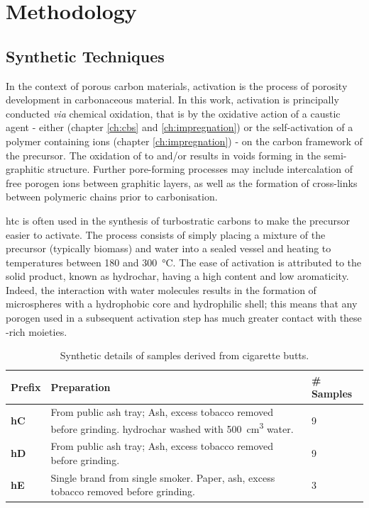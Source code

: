 \chapter{Methodology}
\label{ch:methodology}

\newpage
\section{Synthetic Techniques}

In the context of porous carbon materials, activation is the process of porosity development in carbonaceous material.\citep{Sevilla2014Energy} In this work, activation is principally conducted \textit{via} chemical oxidation,\citep{Sevilla2014Energy} that is by the oxidative action of a caustic agent - either  (chapter \ref{ch:cbs} and \ref{ch:impregnation}) or the self-activation of a polymer containing  ions (chapter \ref{ch:impregnation}) - on the carbon framework of the precursor. The oxidation of  to  and/or  results in voids forming in the semi-graphitic structure.\citep{Wang2009High, Wang2012, Otowa1993Production} Further pore-forming processes may include intercalation of free \gls{porogen} ions between graphitic layers,\citep{LozanoCastello2007Carbon} as well as the formation of cross-links between polymeric chains prior to carbonisation.\citep{lin2015preparation, yu2017koh, yu2017one}

\Gls{htc} is often used in the synthesis of \glspl{turbostratic carbon} to make the precursor easier to activate. The process consists of simply placing a mixture of the precursor (typically biomass) and water into a sealed vessel and heating to temperatures between 180 and \qty{300}{\degreeCelsius}. The ease of activation is attributed to the solid product, known as \gls{hydrochar}, having a high  content and low aromaticity.\citep{Sevilla2011Hydrothermal, Sevilla2009Chemical, Sevilla2009a} Indeed, the interaction with water molecules results in the formation of microspheres with a hydrophobic core and hydrophilic shell; this means that any \gls{porogen} used in a subsequent activation step has much greater contact with these -rich moieties.

\begin{table}[ht!]
    \caption{Synthetic details of samples derived from cigarette butts.}
    \label{tb:cb_synthesis}
    \begin{tabularx}{\textwidth}{lXl}
        \toprule
            \textbf{Prefix} & \textbf{Preparation}  & \textbf{\# Samples} \\ 
        \midrule
            \textbf{hC}     & From public ash tray; Ash, excess tobacco removed before grinding. \Gls{hydrochar} washed with \qty{500}{\cm\cubed} water.  & 9              \\
            \textbf{hD}     &  From public ash tray; Ash, excess tobacco removed before grinding. & 9             \\
            \textbf{hE}     & Single brand from single smoker. Paper, ash, excess tobacco removed before grinding.  & 3              \\
        \bottomrule
    \end{tabularx}%
\end{table}

